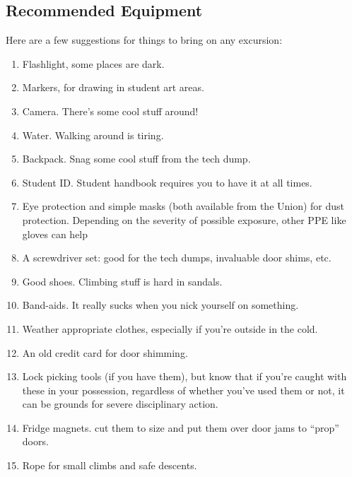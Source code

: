 \documentclass{article}
\begin{document}
\subsection{Recommended Equipment}
Here are a few suggestions for things to bring on any excursion:
\begin{enumerate}
\item Flashlight, some places are dark.
\item Markers, for drawing in student art areas.
\item Camera. There’s some cool stuff around!
\item Water. Walking around is tiring.
\item Backpack. Snag some cool stuff from the tech dump.
\item Student ID. Student handbook requires you to have it at all times.
\item Eye protection and simple masks (both available from the Union) for dust protection.
Depending on the severity of possible exposure, other PPE like gloves can help
\item A screwdriver set: good for the tech dumps, invaluable door shims, etc.
\item Good shoes. Climbing stuff is hard in sandals.
\item Band-aids. It really sucks when you nick yourself on something.
\item Weather appropriate clothes, especially if you’re outside in the cold.
\item An old credit card for door shimming.
\item Lock picking tools (if you have them), but know that if you’re caught with these in your
possession, regardless of whether you’ve used them or not, it can be grounds for severe
disciplinary action.
\item Fridge magnets. cut them to size and put them over door jams to “prop” doors.
\item Rope for small climbs and safe descents.
\end{enumerate}
\end{document}
